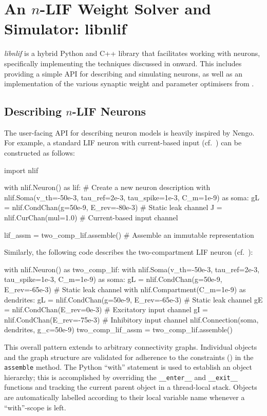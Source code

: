 
\section{An $n$-LIF Weight Solver and Simulator: libnlif}
\label{app:libnlif}

\emph{libnlif} is a hybrid Python and C++ library that facilitates working with \nlif neurons, specifically implementing the techniques discussed in  onward.
This includes providing a simple API for describing and simulating \nlif neurons, as well as an implementation of the various synaptic weight and parameter optimisers from .

\subsection{Describing $n$-LIF Neurons}

The user-facing API for describing neuron models is heavily inspired by Nengo.
For example, a standard LIF neuron with current-based input (cf.~) can be constructed as follows:
\begin{pythoncode}
import nlif

with nlif.Neuron() as lif: # Create a new neuron description 
	with nlif.Soma(v_th=-50e-3, tau_ref=2e-3, tau_spike=1e-3, C_m=1e-9) as soma:
		gL = nlif.CondChan(g=50e-9, E_rev=-80e-3) # Static leak channel
		J = nlif.CurChan(mul=1.0)                 # Current-based input channel

lif_assm = two_comp_lif.assemble() # Assemble an immutable representation
\end{pythoncode}
Similarly, the following code describes the two-compartment LIF neuron (cf.~):
\begin{pythoncode}
with nlif.Neuron() as two_comp_lif:
	with nlif.Soma(v_th=-50e-3, tau_ref=2e-3, tau_spike=1e-3, C_m=1e-9) as soma:
		gL = nlif.CondChan(g=50e-9, E_rev=-65e-3)  # Static leak channel
	with nlif.Compartment(C_m=1e-9) as dendrites:
		gL = nlif.CondChan(g=50e-9, E_rev=-65e-3)  # Static leak channel
		gE = nlif.CondChan(E_rev=0e-3)             # Excitatory input channel
		gI = nlif.CondChan(E_rev=-75e-3)           # Inhibitory input channel
	nlif.Connection(soma, dendrites, g_c=50e-9)
two_comp_lif_assm = two_comp_lif.assemble()
\end{pythoncode}
This overall pattern extends to arbitrary connectivity graphs.
Individual objects and the graph structure are validated for adherence to the \nlif constraints () in the \texttt{assemble} method.
The Python \enquote{with} statement is used to establish an object hierarchy; this is accomplished by overriding the \texttt{\_\_enter\_\_} and \texttt{\_\_exit\_\_} functions and tracking the current parent object in a thread-local stack.
Objects are automatically labelled according to their local variable name whenever a \enquote{with}-scope is left.

